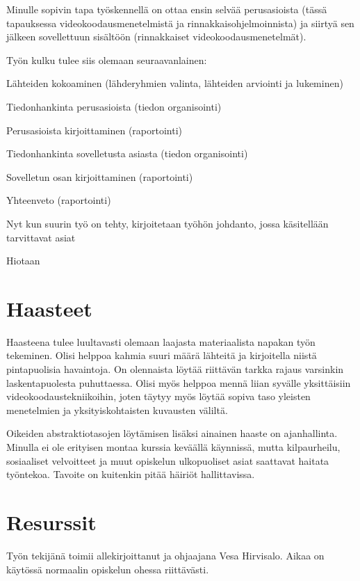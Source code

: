 \documentclass[12pt,a4paper,finnish,oneside]{article}
\begin{document}
Minulle sopivin tapa työskennellä on ottaa ensin selvää perusasioista (tässä
tapauksessa videokoodausmenetelmistä ja rinnakkaisohjelmoinnista) ja siirtyä
sen jälkeen sovellettuun sisältöön (rinnakkaiset videokoodausmenetelmät).

Työn kulku tulee siis olemaan seuraavanlainen:
\begin{compactitem}
\item Lähteiden kokoaminen (lähderyhmien valinta, lähteiden arviointi ja
lukeminen)
\item Tiedonhankinta perusasioista (tiedon organisointi)
\item Perusasioista kirjoittaminen (raportointi)
\item Tiedonhankinta sovelletusta asiasta (tiedon organisointi)
\item Sovelletun osan kirjoittaminen (raportointi)
\item Yhteenveto (raportointi)
\item Nyt kun suurin työ on tehty, kirjoitetaan työhön johdanto, jossa
käsitellään tarvittavat asiat
\item Hiotaan
\end{compactitem}

\section{Haasteet}

Haasteena tulee luultavasti olemaan laajasta materiaalista napakan työn
tekeminen. Olisi helppoa kahmia suuri määrä lähteitä ja kirjoitella
niistä pintapuolisia havaintoja. On olennaista löytää riittävän tarkka rajaus
varsinkin laskentapuolesta puhuttaessa. Olisi myös helppoa mennä liian
syvälle yksittäisiin videokoodaustekniikoihin, joten täytyy myös löytää
sopiva taso yleisten menetelmien ja yksityiskohtaisten kuvausten väliltä.

Oikeiden abstraktiotasojen löytämisen lisäksi ainainen haaste on ajanhallinta.
Minulla ei ole erityisen montaa kurssia keväällä käynnissä, mutta kilpaurheilu,
sosiaaliset velvoitteet ja muut opiskelun ulkopuoliset asiat saattavat haitata
työntekoa. Tavoite on kuitenkin pitää häiriöt hallittavissa.

\section{Resurssit}

Työn tekijänä toimii allekirjoittanut ja ohjaajana Vesa Hirvisalo. Aikaa on
käytössä normaalin opiskelun ohessa riittävästi.
\end{document}
